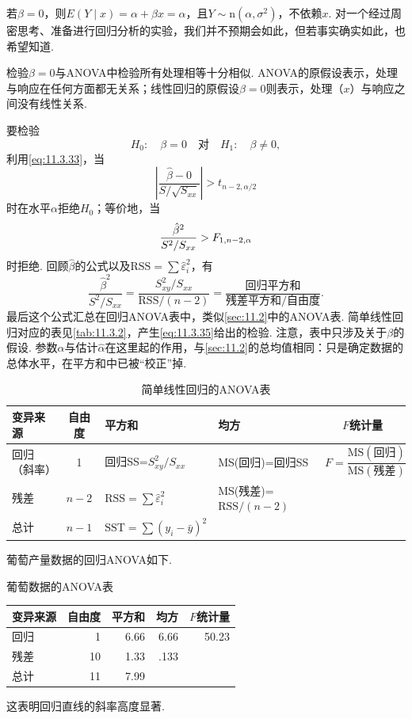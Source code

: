 若$\beta=0$，则$E(Y\mid x)=\alpha+\beta x=\alpha$，且$Y\sim\mathrm n(\alpha,\sigma^2)$，不依赖$x$. 对一个经过周密思考、准备进行回归分析的实验，我们并不预期会如此，但若事实确实如此，也希望知道.

检验$\beta=0$与ANOVA中检验所有处理相等十分相似. ANOVA的原假设表示，处理与响应在任何方面都无关系；线性回归的原假设$\beta=0$则表示，处理（$x$）与响应之间没有线性关系.

要检验
\begin{equation}\label{eq:11.3.34}
H_0:\quad\beta=0\quad\text{对}\quad H_1:\quad\beta\ne0,
\end{equation}
利用\eqref{eq:11.3.33}，当
$$\left|\frac{\hat\beta-0}{S/\sqrt{S_{xx}}}\right|>t_{n-2,\alpha/2}$$
时在水平$\alpha$拒绝$H_0$；等价地，当
\begin{equation}\label{eq:11.3.35}\index{SI0909@t检验}
\frac{\hat\beta^2}{S^2/S_{xx}}>F_{1,n-2,\alpha}
\end{equation}
时拒绝. 回顾$\hat\beta$的公式以及$\mathrm{RSS}=\sum\hat\varepsilon_i^2$，有
$$\frac{\hat\beta^2}{S^2/S_{xx}}
=\frac{S_{xy}^2/S_{xx}}{\mathrm{RSS}/(n-2)}
=\frac{\text{回归平方和}}{\text{残差平方和}/\text{自由度}}.$$
最后这个公式汇总在回归ANOVA表中，类似\autoref{sec:11.2}中的ANOVA表. 简单线性回归对应的表见\autoref{tab:11.3.2}，产生\eqref{eq:11.3.35}给出的检验. 注意，表中只涉及关于$\beta$的假设. 参数$\alpha$与估计$\hat\alpha$在这里起的作用，与\autoref{sec:11.2}的总均值相同：只是确定数据的总体水平，在平方和中已被“校正”掉.

\begin{table}[htbp]
\centering\caption{简单线性回归的ANOVA表}\label{tab:11.3.2}
\small
\begin{tabular}{lcp{}p{}c}
\toprule 变异来源&自由度&平方和&均方&$F$统计量\\\midrule
回归（斜率）&1&回归SS=$S_{xy}^2/S_{xx}$&MS(回归)=回归SS&$F=\dfrac{\mathrm{MS}(\text{回归})}{\mathrm{MS}(\text{残差})}$\\[1ex]
残差&$n-2$&$\mathrm{RSS}=\sum\hat\varepsilon_i^2$&MS(残差)=\newline$\mathrm{RSS}/(n-2)$&\\[1ex]
总计&$n-1$&$\mathrm{SST}=\sum(y_i-\bar y)^2$&&\\\bottomrule
\end{tabular}
\end{table}

\begin{example}[\autoref{ex:11.3.1}续]\label{ex:11.3.4}
葡萄产量数据的回归ANOVA如下.
\begin{center}
葡萄数据的ANOVA表

\begin{tabular}{lrrrr}
\toprule 变异来源&自由度&平方和&均方&$F$统计量\\\midrule
回归&1&6.66&6.66&50.23\\
残差&10&1.33&.133&\\
总计&11&7.99&&\\\bottomrule
\end{tabular}
\end{center}
这表明回归直线的斜率高度显著.
\end{example}

